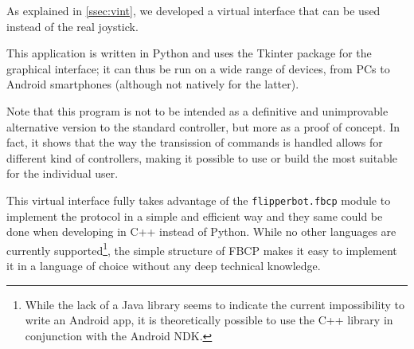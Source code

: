 As explained in \autoref{ssec:vint}, we developed a virtual interface that can
be used instead of the real joystick.

This application is written in Python and uses the Tkinter package for the
graphical interface; it can thus be run on a wide range of devices, from PCs
to Android smartphones (although not natively for the latter).

Note that this program is not to be intended as a definitive and unimprovable
alternative version to the standard controller, but more as a proof of concept.
In fact, it shows that the way the transission of commands is handled allows for
different kind of controllers, making it possible to use or build the most
suitable for the individual user.

This virtual interface fully takes advantage of the \Verb|flipperbot.fbcp|
module to implement the protocol in a simple and efficient way and they same
could be done when developing in C++ instead of Python. While no other languages
are currently supported\footnote{While the lack of a Java library seems to
indicate the current impossibility to write an Android app, it is theoretically
possible to use the C++ library in conjunction with the Android NDK.}, the simple structure of FBCP makes it easy
to implement it in a language of choice without any deep technical knowledge.
